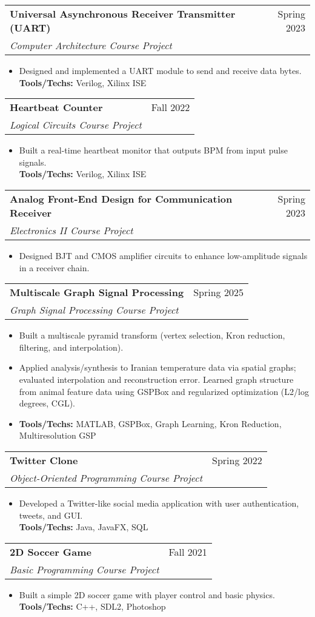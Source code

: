 \documentclass[letterpaper,11pt]{article}
\makeatletter
\newcommand{\resumeItem}[1]{
	\item\small{
		{#1 \vspace{-2pt}}
	}
}
\newcommand{\resumeSubheading}[4]{
	\vspace{-2pt}\item
	\begin{tabular*}{0.97\textwidth}[t]{l@{\extracolsep{\fill}}r}
		\textbf{#1} & #2 \\
		\textit{\small#3} & \textit{\small #4} \\
	\end{tabular*}\vspace{-7pt}
}
\newcommand{\resumeItemListStart}{\begin{itemize}}
\newcommand{\resumeItemListEnd}{\end{itemize}\vspace{-5pt}}
\makeatother
\begin{document}
\resumeSubheading
    {Universal Asynchronous Receiver Transmitter (UART)}{Spring 2023}    
    {Computer Architecture Course Project}{}   
    \resumeItemListStart
        \resumeItem{Designed and implemented a UART module to send and receive data bytes.\\ \textbf{Tools/Techs:} Verilog, Xilinx ISE}    
    \resumeItemListEnd

\resumeSubheading
    {Heartbeat Counter}{Fall 2022}    
    {Logical Circuits Course Project}{}   
    \resumeItemListStart
        \resumeItem{Built a real-time heartbeat monitor that outputs BPM from input pulse signals.\\ \textbf{Tools/Techs:} Verilog, Xilinx ISE}    
    \resumeItemListEnd

\resumeSubheading
    {Analog Front-End Design for Communication Receiver}{Spring 2023}    
    {Electronics II Course Project}{}   
    \resumeItemListStart
        \resumeItem{Designed BJT and CMOS amplifier circuits to enhance low-amplitude signals in a receiver chain.}    
    \resumeItemListEnd

\resumeSubheading
    {Multiscale Graph Signal Processing}{Spring 2025}
    {Graph Signal Processing Course Project}{}   
    \resumeItemListStart
        \resumeItem{Built a multiscale pyramid transform (vertex selection, Kron reduction, filtering, and interpolation).}
        \resumeItem{Applied analysis/synthesis to Iranian temperature data via spatial graphs; evaluated interpolation and reconstruction error. Learned graph structure from animal feature data using GSPBox and regularized optimization (L2/log degrees, CGL).}
        \resumeItem{\textbf{Tools/Techs:} MATLAB, GSPBox, Graph Learning, Kron Reduction, Multiresolution GSP}
    \resumeItemListEnd



\resumeSubheading
    {Twitter Clone}{Spring 2022}    
    {Object-Oriented Programming Course Project}{}   
    \resumeItemListStart
        \resumeItem{Developed a Twitter-like social media application with user authentication, tweets, and GUI.\\ \textbf{Tools/Techs:} Java, JavaFX, SQL}    
    \resumeItemListEnd

\resumeSubheading
    {2D Soccer Game}{Fall 2021}    
    {Basic Programming Course Project}{}   
    \resumeItemListStart
        \resumeItem{Built a simple 2D soccer game with player control and basic physics.\\ \textbf{Tools/Techs:} C++, SDL2, Photoshop}    
    \resumeItemListEnd    
\end{document}
